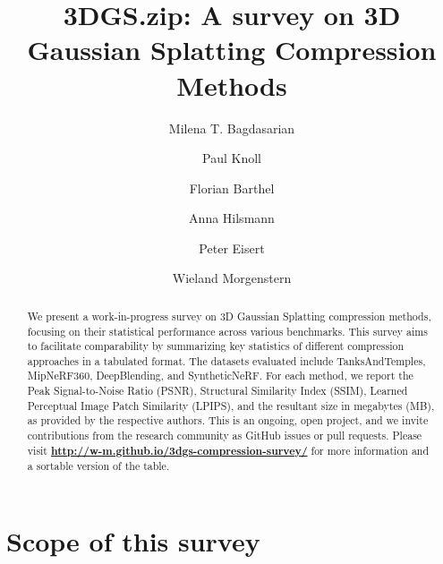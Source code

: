 \documentclass{article}
\title{3DGS.zip: A survey on 3D Gaussian Splatting Compression Methods}
\author[1]{Milena T. Bagdasarian}
\author[1]{Paul Knoll}
\author[1,2]{Florian Barthel}
\author[1]{Anna Hilsmann}
\author[1,2]{Peter Eisert}
\author[1]{Wieland Morgenstern}
\affil[1]{Fraunhofer Heinrich Hertz, HHI}
\affil[2]{Humboldt University of Berlin}
\date{}
\begin{document}
\maketitle

\begin{abstract}

    We present a work-in-progress survey on 3D Gaussian Splatting\cite{kerbl3Dgaussians} compression methods, 
    focusing on their statistical performance across various benchmarks. This survey aims 
    to facilitate comparability by summarizing key statistics of different compression 
    approaches in a tabulated format. The datasets evaluated include TanksAndTemples\cite{TanksAndTemples}, 
    MipNeRF360\cite{MipNeRF360}, DeepBlending\cite{DeepBlending}, and SyntheticNeRF\cite{SyntheticNeRF}. For each method, we report the Peak 
    Signal-to-Noise Ratio (PSNR), Structural Similarity Index (SSIM), Learned Perceptual 
    Image Patch Similarity (LPIPS), and the resultant size in megabytes (MB), as 
    provided by the respective authors.
    This is an ongoing, open project, and we invite contributions from the research community 
    as GitHub issues or pull requests. Please visit \mbox{\bfseries\url{http://w-m.github.io/3dgs-compression-survey/}}
    for more information and a sortable version of the table.
    
\end{abstract}


\section*{Scope of this survey}
\end{document}
